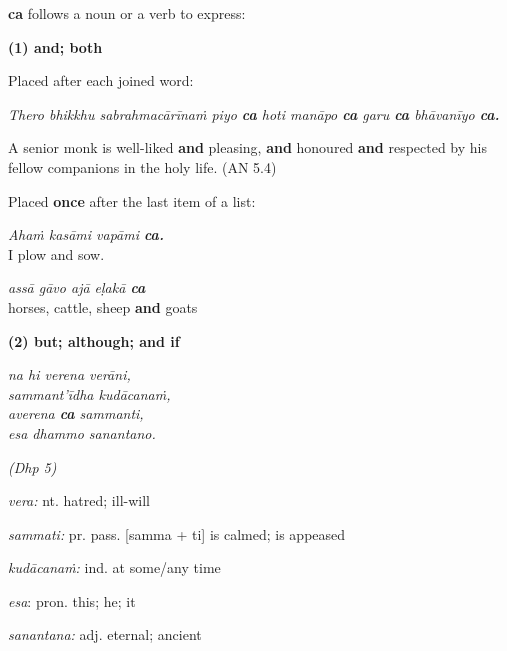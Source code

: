 \documentclass[11pt,oneside]{memoir}
\begin{document}
\textbf{ca} follows a noun or a verb to express:

\begin{multicols}{2}

\textbf{(1) and; both}

Placed after each joined word:

\emph{Thero bhikkhu sabrahmacārīnaṁ piyo \textbf{ca} hoti manāpo \textbf{ca} garu \textbf{ca} bhāvanīyo \textbf{ca.}}

A senior monk is well-liked \textbf{and} pleasing, \textbf{and} honoured \textbf{and} respected by his fellow companions in the holy life. (AN 5.4)

Placed \textbf{once} after the last item of a list:

\emph{Ahaṁ kasāmi vapāmi \textbf{ca.}} \\[0pt]
I plow and sow.

\emph{assā gāvo ajā eḷakā \textbf{ca}} \\[0pt]
horses, cattle, sheep \textbf{and} goats

\columnbreak

\textbf{(2) but; although; and if}

\emph{na hi verena verāni,} \\[0pt]
\emph{sammant'īdha kudācanaṁ,} \\[0pt]
\emph{averena \textbf{ca} sammanti,} \\[0pt]
\emph{esa dhammo sanantano.}

\emph{(Dhp 5)}

\emph{vera:} nt. hatred; ill-will

\emph{sammati:} pr. pass. [samma + ti] is calmed; is appeased

\emph{kudācanaṁ:} ind. at some/any time

\emph{esa}: pron. this; he; it

\emph{sanantana:} adj. eternal; ancient

\end{multicols}

\clearpage
\end{document}
